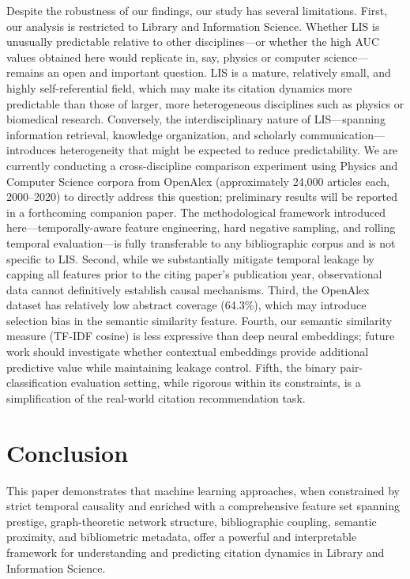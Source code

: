 \documentclass[12pt,a4paper]{article}
\begin{document}
Despite the robustness of our findings, our study has several limitations. First,
our analysis is restricted to Library and Information Science. Whether LIS is
unusually predictable relative to other disciplines---or whether the high AUC values
obtained here would replicate in, say, physics or computer science---remains an open
and important question. LIS is a mature, relatively small, and highly self-referential
field, which may make its citation dynamics more predictable than those of larger,
more heterogeneous disciplines such as physics or biomedical research. Conversely,
the interdisciplinary nature of LIS---spanning information retrieval, knowledge
organization, and scholarly communication---introduces heterogeneity that might
be expected to reduce predictability. We are currently conducting a cross-discipline
comparison experiment using Physics and Computer Science corpora from OpenAlex
(approximately 24,000 articles each, 2000--2020) to directly address this question;
preliminary results will be reported in a forthcoming companion paper. The
methodological framework introduced here---temporally-aware feature engineering,
hard negative sampling, and rolling temporal evaluation---is fully transferable to
any bibliographic corpus and is not specific to LIS. Second, while we substantially mitigate temporal leakage by
capping all features prior to the citing paper's publication year, observational
data cannot definitively establish causal mechanisms. Third, the OpenAlex dataset
has relatively low abstract coverage (64.3\%), which may introduce selection bias
in the semantic similarity feature. Fourth, our semantic similarity measure (TF-IDF
cosine) is less expressive than deep neural embeddings; future work should
investigate whether contextual embeddings provide additional predictive value while
maintaining leakage control. Fifth, the binary pair-classification evaluation
setting, while rigorous within its constraints, is a simplification of the real-world
citation recommendation task.

\section{Conclusion}
\label{sec:conclusion}

This paper demonstrates that machine learning approaches, when constrained by
strict temporal causality and enriched with a comprehensive feature set spanning
prestige, graph-theoretic network structure, bibliographic coupling, semantic
proximity, and bibliometric metadata, offer a powerful and interpretable framework
for understanding and predicting citation dynamics in Library and Information Science.
\end{document}
